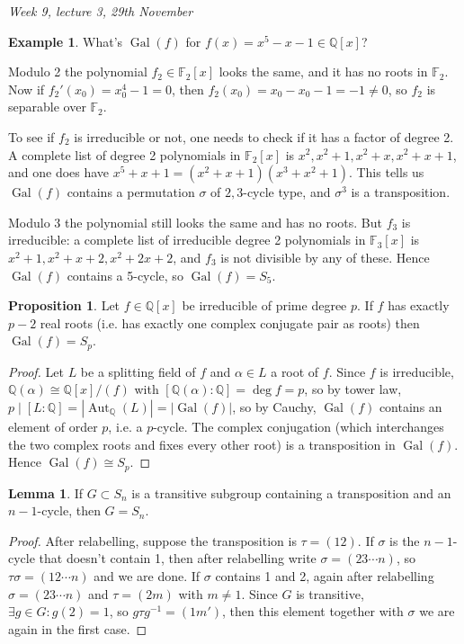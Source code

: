 \documentclass{article}
\newcommand{\F}{\mathbb{F}}
\newcommand{\Q}{\mathbb{Q}}
\newcommand{\Aut}{\operatorname{Aut}}
\newcommand{\Gal}{\operatorname{Gal}}
\theoremstyle{definition}
\newtheorem{prop}[defn]{Proposition}
\newtheorem{lemma}[defn]{Lemma}
\newtheorem{example}[defn]{Example}
\begin{document}
\begin{flushright}
\textit{Week 9, lecture 3, 29th November}
\end{flushright}

\begin{example}
What's $\Gal(f)$ for $f(x)=x^5-x-1\in\Q[x]$?

Modulo 2 the polynomial $f_2\in\F_2[x]$ looks the same, and it has no roots in $\F_2$. Now if $f_2'(x_0)=x_0^4-1=0$, then $f_2(x_0)=x_0-x_0-1=-1\neq 0$, so $f_2$ is separable over $\F_2$.

To see if $f_2$ is irreducible or not, one needs to check if it has a factor of degree 2. A complete list of degree 2 polynomials in $\F_2[x]$ is $x^2,x^2+1,x^2+x,x^2+x+1$, and one does have $x^5+x+1=(x^2+x+1)(x^3+x^2+1)$. This tells us $\Gal(f)$ contains a permutation $\sigma$ of $2,3$-cycle type, and $\sigma^3$ is a transposition.

Modulo 3 the polynomial still looks the same and has no roots. But $f_3$ is irreducible: a complete list of irreducible degree 2 polynomials in $\F_3[x]$ is $x^2+1,x^2+x+2,x^2+2x+2$, and $f_3$ is not divisible by any of these. Hence $\Gal(f)$ contains a 5-cycle, so $\Gal(f)=S_5$.
\end{example}

\begin{prop}
Let $f\in\Q[x]$ be irreducible of prime degree $p$. If $f$ has exactly $p-2$ real roots (i.e. has exactly one complex conjugate pair as roots) then $\Gal(f)=S_p$.
\end{prop}
\begin{proof}
Let $L$ be a splitting field of $f$ and $\alpha\in L$ a root of $f$. Since $f$ is irreducible, $\Q(\alpha)\cong\Q[x]/(f)$ with $[\Q(\alpha):\Q]=\deg f=p$, so by tower law, $p\mid [L:\Q]=|\!\Aut_\Q(L)|=|\!\Gal(f)|$, so by Cauchy, $\Gal(f)$ contains an element of order $p$, i.e. a $p$-cycle. The complex conjugation (which interchanges the two complex roots and fixes every other root) is a transposition in $\Gal(f)$. Hence $\Gal(f)\cong S_p$.
\end{proof}

\begin{lemma}
If $G\subset S_n$ is a transitive subgroup containing a transposition and an $n-1$-cycle, then $G=S_n$.
\end{lemma}
\begin{proof}
After relabelling, suppose the transposition is $\tau=(12)$. If $\sigma$ is the $n-1$-cycle that doesn't contain 1, then after relabelling write $\sigma=(23\cdots n)$, so $\tau\sigma=(12\cdots n)$ and we are done. If $\sigma$ contains 1 and 2, again after relabelling $\sigma=(23\cdots n)$ and $\tau=(2m)$ with $m\neq 1$. Since $G$ is transitive, $\exists g\in G:g(2)=1$, so $g\tau g^{-1}=(1m')$, then this element together with $\sigma$ we are again in the first case.
\end{proof}
\end{document}
